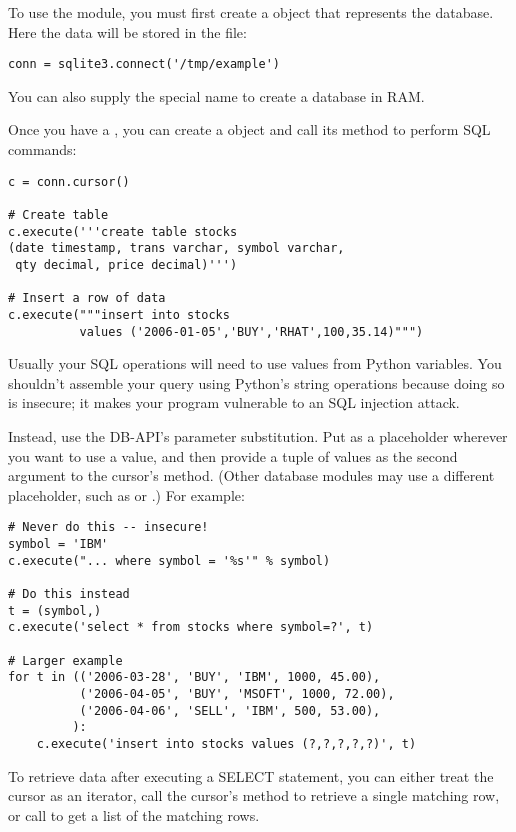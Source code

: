 \documentclass{howto}
\begin{document}
To use the module, you must first create a  object
that represents the database.  Here the data will be stored in the 
 file:

\begin{verbatim}
conn = sqlite3.connect('/tmp/example')
\end{verbatim}

You can also supply the special name  to create
a database in RAM.

Once you have a , you can create a  
object and call its  method to perform SQL commands:

\begin{verbatim}
c = conn.cursor()

# Create table
c.execute('''create table stocks
(date timestamp, trans varchar, symbol varchar,
 qty decimal, price decimal)''')

# Insert a row of data
c.execute("""insert into stocks
          values ('2006-01-05','BUY','RHAT',100,35.14)""")
\end{verbatim}    

Usually your SQL operations will need to use values from Python
variables.  You shouldn't assemble your query using Python's string
operations because doing so is insecure; it makes your program
vulnerable to an SQL injection attack.  

Instead, use the DB-API's parameter substitution.  Put  as a
placeholder wherever you want to use a value, and then provide a tuple
of values as the second argument to the cursor's 
method.  (Other database modules may use a different placeholder,
such as  or .) For example:

\begin{verbatim}    
# Never do this -- insecure!
symbol = 'IBM'
c.execute("... where symbol = '%s'" % symbol)

# Do this instead
t = (symbol,)
c.execute('select * from stocks where symbol=?', t)

# Larger example
for t in (('2006-03-28', 'BUY', 'IBM', 1000, 45.00),
          ('2006-04-05', 'BUY', 'MSOFT', 1000, 72.00),
          ('2006-04-06', 'SELL', 'IBM', 500, 53.00),
         ):
    c.execute('insert into stocks values (?,?,?,?,?)', t)
\end{verbatim}

To retrieve data after executing a SELECT statement, you can either 
treat the cursor as an iterator, call the cursor's 
method to retrieve a single matching row, 
or call  to get a list of the matching rows.
\end{document}
